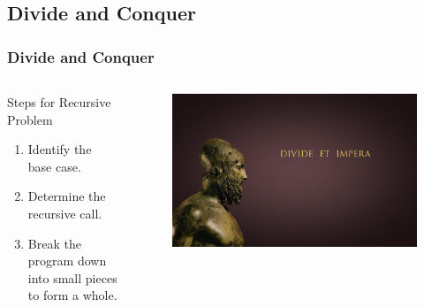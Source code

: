 \message{ !name(recursion.tex)}\documentclass[fleqn, t]{beamer}
\begin{document}
\subsection{Divide and Conquer}
\begin{frame}[c]
  \frametitle{Divide and Conquer}
  \begin{columns}[t]
    \begin{column}{.4\textwidth}
      \begin{block}{Steps for Recursive Problem}
        \begin{enumerate}[<+->]
        \item Identify the base case.
        \item Determine the recursive call.
        \item Break the program down into small pieces to form a whole.
        \end{enumerate}
      \end{block}
    \end{column}

    \begin{column}{.6\textwidth}
      \begin{figure}
        \includegraphics[scale=0.2]{divide.jpg}
      \end{figure}

    \end{column}
  \end{columns}

\end{frame}
\end{document}
